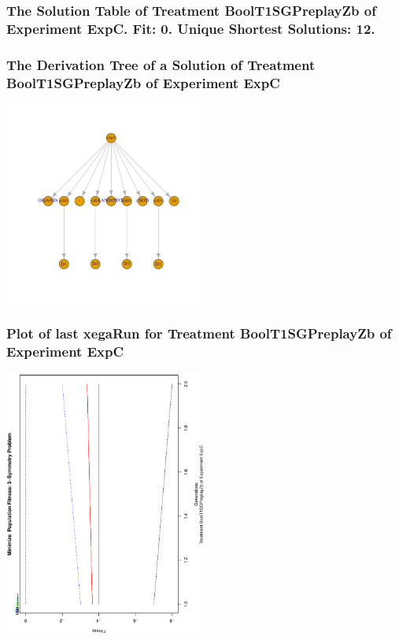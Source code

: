 \documentclass[18pt,c]{beamer}
\begin{document}
 \begin{frame}
 \fontsize{8pt}{9pt}\selectfont
 \frametitle{ The Solution Table of Treatment BoolT1SGPreplayZb of Experiment ExpC. Fit: 0. Unique Shortest Solutions: 12. }

 \label{ExpCSolutionTable003.tex}  
 \end{frame}

 \begin{frame}
 \frametitle{ The Derivation Tree of a Solution of Treatment BoolT1SGPreplayZb of Experiment ExpC }
 \begin{center}
\includegraphics[width=0.5\textwidth, angle=0]
{ExpCDerivationTreeFigure003.pdf}
 \end{center}
 \label{report/ExpCDerivationTreeFigure003.pdf}  
 \end{frame}

 \begin{frame}
 \frametitle{ Plot of last xegaRun for Treatment BoolT1SGPreplayZb of Experiment ExpC }
 \begin{center}
\includegraphics[width=0.5\textwidth, angle=-90]
{ExpCPlotPopStatsFigure003.eps}
 \end{center}
 \label{report/ExpCPlotPopStatsFigure003.eps}  
 \end{frame}
\end{document}
